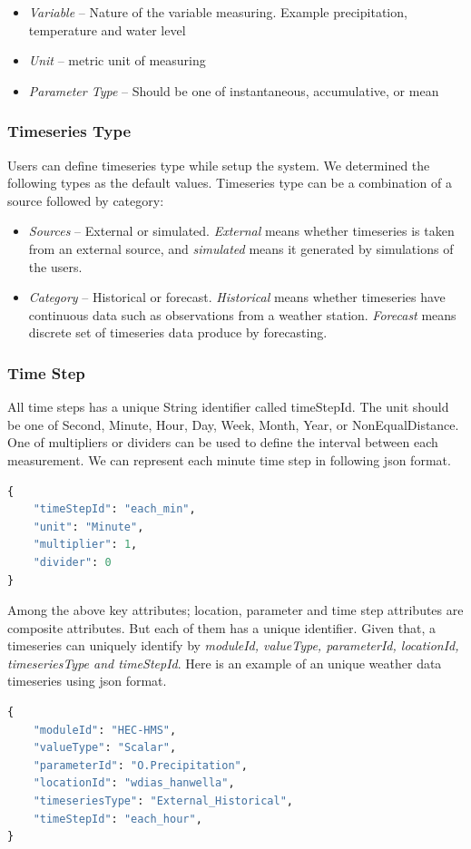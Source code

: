 \begin{itemize}  
  \item \emph{Variable} -- Nature of the variable measuring. Example precipitation, temperature and water level
  \item \emph{Unit} -- metric unit of measuring
  \item \emph{Parameter Type} -- Should be one of instantaneous, accumulative, or mean
\end{itemize}

\subsubsection{Timeseries Type}
Users can define timeseries type while setup the system. We determined the following types as the default values. Timeseries type can be a combination of a source followed by category:
\begin{itemize}
  \item \emph{Sources} -- External or simulated. \emph{External} means whether timeseries is taken from an external source, and \emph{simulated} means it generated by simulations of the users.
  \item \emph{Category} -- Historical or forecast. \emph{Historical} means whether timeseries have continuous data such as observations from a weather station. \emph{Forecast} means discrete set of timeseries data produce by forecasting.
\end{itemize}

\subsubsection{Time Step}
All time steps has a unique String identifier called timeStepId. The unit should be one of Second, Minute, Hour, Day, Week, Month, Year, or NonEqualDistance. One of multipliers or dividers can be used to define the interval between each measurement. We can represent each minute time step in following \acrshort{json} format.
\begin{lstlisting}[language=Python]
{
    "timeStepId": "each_min",
    "unit": "Minute",
    "multiplier": 1,
    "divider": 0
}
\end{lstlisting}

Among the above key attributes; location, parameter and time step attributes are composite attributes. But each of them has a unique identifier.
Given that, a timeseries can uniquely identify by \emph{moduleId, valueType, parameterId, locationId, timeseriesType and timeStepId}. Here is an example of an unique weather data timeseries using \acrshort{json} format.
\begin{lstlisting}[language=Python]
{
	"moduleId": "HEC-HMS",
	"valueType": "Scalar",
	"parameterId": "O.Precipitation",
	"locationId": "wdias_hanwella",
	"timeseriesType": "External_Historical",
	"timeStepId": "each_hour",
}
\end{lstlisting}


